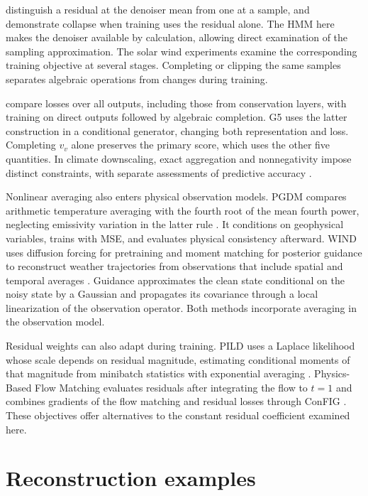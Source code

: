 \documentclass{article}
\begin{document}
\citet[Section 3.3 and Appendix A.6.1]{bastek2025pidm} distinguish a residual at the denoiser mean from one at a sample, and demonstrate collapse when training uses the residual alone. The HMM here makes the denoiser available by calculation, allowing direct examination of the sampling approximation. The solar wind experiments examine the corresponding training objective at several stages. Completing or clipping the same samples separates algebraic operations from changes during training.

\citet{beucler2021constraints} compare losses over all outputs, including those from conservation layers, with training on direct outputs followed by algebraic completion. G5 uses the latter construction in a conditional generator, changing both representation and loss. Completing $v_v$ alone preserves the primary score, which uses the other five quantities. In climate downscaling, exact aggregation and nonnegativity impose distinct constraints, with separate assessments of predictive accuracy \citep{harder2023hard}.

Nonlinear averaging also enters physical observation models. PGDM compares arithmetic temperature averaging with the fourth root of the mean fourth power, neglecting emissivity variation in the latter rule \citep{zhang2025pgdm}. It conditions on geophysical variables, trains with MSE, and evaluates physical consistency afterward. WIND uses diffusion forcing for pretraining and moment matching for posterior guidance to reconstruct weather trajectories from observations that include spatial and temporal averages \citep{aich2026wind}. Guidance approximates the clean state conditional on the noisy state by a Gaussian and propagates its covariance through a local linearization of the observation operator. Both methods incorporate averaging in the observation model.

Residual weights can also adapt during training. PILD uses a Laplace likelihood whose scale depends on residual magnitude, estimating conditional moments of that magnitude from minibatch statistics with exponential averaging \citep{zeng2026pild}. Physics-Based Flow Matching evaluates residuals after integrating the flow to $t=1$ and combines gradients of the flow matching and residual losses through ConFIG \citep{baldan2025physics}. These objectives offer alternatives to the constant residual coefficient examined here.

\section{Reconstruction examples}
\label{app:imputation}
\end{document}
